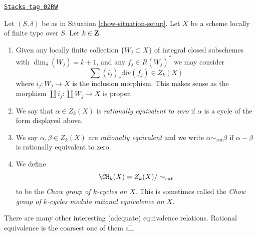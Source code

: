 \begin{definition}
\label{chow-definition-rational-equivalence}
\href{https://stacks.math.columbia.edu/tag/02RW}{\texttt{Stacks tag 02RW}}

Let $(S, \delta)$ be as in Situation \ref{chow-situation-setup}.
Let $X$ be a scheme locally of finite type over $S$.
Let $k \in \mathbf{Z}$.
\begin{enumerate}
\item Given any locally finite collection $\{W_j \subset X\}$
of integral closed subschemes with $\dim_\delta(W_j) = k + 1$,
and any $f_j \in R(W_j)^*$ we may consider
$$
\sum (i_j)_*\text{div}(f_j) \in Z_k(X)
$$
where $i_j : W_j \to X$ is the inclusion morphism.
This makes sense as the morphism
$\coprod i_j : \coprod W_j \to X$ is proper.
\item We say that $\alpha \in Z_k(X)$ is {\it rationally equivalent to zero}
if $\alpha$ is a cycle of the form displayed above.
\item We say $\alpha, \beta \in Z_k(X)$ are
{\it rationally equivalent} and we write $\alpha \sim_{rat} \beta$
if $\alpha - \beta$ is rationally equivalent to zero.
\item We define
$$
\CH_k(X) = Z_k(X) / \sim_{rat}
$$
to be the {\it Chow group of $k$-cycles on $X$}. This is sometimes called
the {\it Chow group of $k$-cycles modulo rational equivalence on $X$}.
\end{enumerate}
\end{definition}

There are many other interesting (adequate) equivalence relations.
Rational equivalence is the coarsest one of them all.


